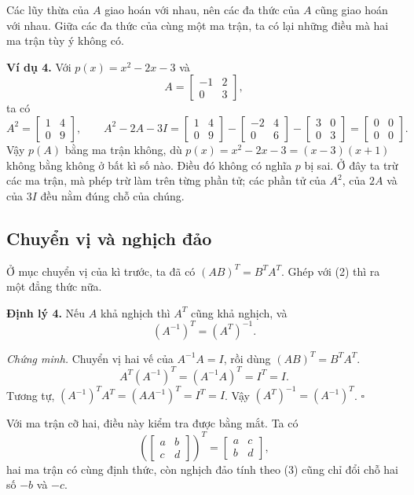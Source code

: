 \documentclass[12pt,a4paper]{article}
\begin{document}
Các lũy thừa của \(A\) giao hoán với nhau, nên các đa thức của \(A\) cũng giao hoán với nhau. Giữa các đa thức của cùng một ma trận, ta có lại những điều mà hai ma trận tùy ý không có.

\textbf{Ví dụ 4.} Với \(p(x)=x^2-2x-3\) và
$$
A=\left[ \begin{array}{rr} -1 & 2\\ 0 & 3 \end{array} \right],
$$
ta có
$$
A^2=\left[ \begin{array}{rr} 1 & 4\\ 0 & 9 \end{array} \right],\qquad
A^2-2A-3I
=\left[ \begin{array}{rr} 1 & 4\\ 0 & 9 \end{array} \right]-\left[ \begin{array}{rr} -2 & 4\\ 0 & 6 \end{array} \right]-\left[ \begin{array}{rr} 3 & 0\\ 0 & 3 \end{array} \right]
=\left[ \begin{array}{rr} 0 & 0\\ 0 & 0 \end{array} \right].
$$
Vậy \(p(A)\) bằng ma trận không, dù \(p(x)=x^2-2x-3=(x-3)(x+1)\) không bằng không ở bất kì số nào. Điều đó không có nghĩa \(p\) bị sai. Ở đây ta trừ các ma trận, mà phép trừ làm trên từng phần tử; các phần tử của \(A^2\), của \(2A\) và của \(3I\) đều nằm đúng chỗ của chúng.

\subsection{Chuyển vị và nghịch đảo}

Ở mục chuyển vị của kì trước, ta đã có \((AB)^T=B^TA^T\). Ghép với (2) thì ra một đẳng thức nữa.

\textbf{Định lý 4.} Nếu \(A\) khả nghịch thì \(A^{T}\) cũng khả nghịch, và
$$
\left(A^{-1}\right)^{T}=\left(A^{T}\right)^{-1}. \tag{9}
$$

\emph{Chứng minh.} Chuyển vị hai vế của \(A^{-1}A=I\), rồi dùng \((AB)^T=B^TA^T\).
$$
A^{T}\left(A^{-1}\right)^{T}=\left(A^{-1}A\right)^{T}=I^{T}=I.
$$
Tương tự, $\left(A^{-1}\right)^{T}A^{T}=\left(AA^{-1}\right)^{T}=I^{T}=I$. Vậy $\left(A^{T}\right)^{-1}=\left(A^{-1}\right)^{T}$. \(\square\)

Với ma trận cỡ hai, điều này kiểm tra được bằng mắt. Ta có
$$
\left(\left[ \begin{array}{rr} a & b\\ c & d \end{array} \right]\right)^{T}
=\left[ \begin{array}{rr} a & c\\ b & d \end{array} \right],
$$
hai ma trận có cùng định thức, còn nghịch đảo tính theo (3) cũng chỉ đổi chỗ hai số \(-b\) và \(-c\).
\end{document}
